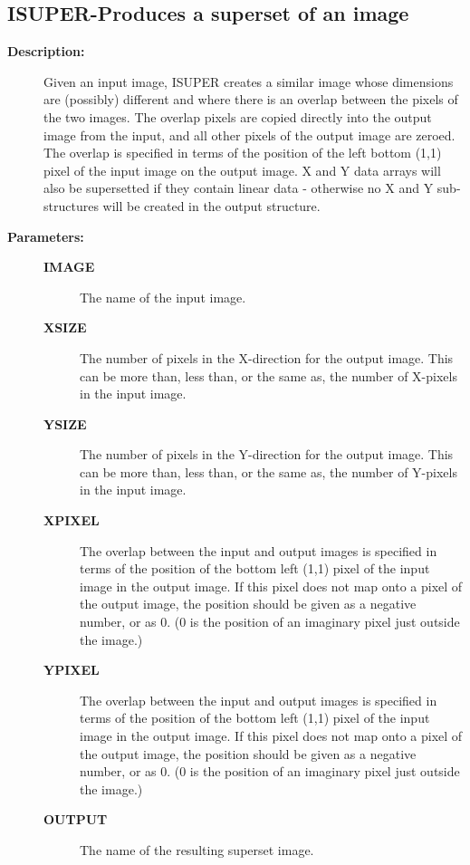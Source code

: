\subsection{ISUPER-\label{ISUPER}Produces a superset of an image}
\begin{description}

\item [{\bf Description:}]
 Given an input image, ISUPER creates a similar image whose
 dimensions are (possibly) different and where there is an
 overlap between the pixels of the two images.  The overlap
 pixels are copied directly into the output image from the
 input, and all other pixels of the output image are zeroed.
 The overlap is specified in terms of the position of the left
 bottom (1,1) pixel of the input image on the output image.
 X and Y data arrays will also be supersetted if they contain
 linear data - otherwise no X and Y sub-structures will be
 created in the output structure.

\item [{\bf Parameters:}]
\begin{description}
\item [{\bf IMAGE}]
 The name of the input image.
\item [{\bf XSIZE}]
 The number of pixels in the X-direction for the
 output image.  This can be more than, less than,
 or the same as, the number of X-pixels in the
 input image.
\item [{\bf YSIZE}]
 The number of pixels in the Y-direction for the
 output image.  This can be more than, less than,
 or the same as, the number of Y-pixels in the
 input image.
\item [{\bf XPIXEL}]
 The overlap between the input and output images is specified
 in terms of the position of the bottom left (1,1) pixel
 of the input image in the output image.  If this pixel does
 not map onto a pixel of the output image, the position
 should be given as a negative number, or as 0.  (0 is the
 position of an imaginary pixel just outside the image.)
\item [{\bf YPIXEL}]
 The overlap between the input and output images is specified
 in terms of the position of the bottom left (1,1) pixel
 of the input image in the output image.  If this pixel does
 not map onto a pixel of the output image, the position
 should be given as a negative number, or as 0.  (0 is the
 position of an imaginary pixel just outside the image.)
\item [{\bf OUTPUT}]
 The name of the resulting superset image.
\end{description}


\end{description}
